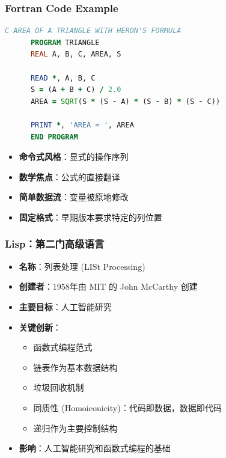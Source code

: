 \documentclass{beamer}
\begin{document}
\begin{frame}[fragile,t]
\frametitle{Fortran Code Example}
\scriptsize
\begin{lstlisting}[language=Fortran, caption=Fortran 77 Style]
C AREA OF A TRIANGLE WITH HERON'S FORMULA
      PROGRAM TRIANGLE
      REAL A, B, C, AREA, S
      
      READ *, A, B, C
      S = (A + B + C) / 2.0
      AREA = SQRT(S * (S - A) * (S - B) * (S - C))
      
      PRINT *, 'AREA = ', AREA
      END PROGRAM
\end{lstlisting}

\begin{itemize}
    \item \textbf{命令式风格}：显式的操作序列
    \item \textbf{数学焦点}：公式的直接翻译
    \item \textbf{简单数据流}：变量被原地修改
    \item \textbf{固定格式}：早期版本要求特定的列位置
\end{itemize}
\end{frame}

\begin{frame}[t]
\frametitle{Lisp：第二门高级语言}
\begin{itemize}
    \item \textbf{名称}：列表处理 (LISt Processing)
    \item \textbf{创建者}：1958年由 MIT 的 John McCarthy 创建
    \item \textbf{主要目标}：人工智能研究
    \item \textbf{关键创新}：
    \begin{itemize}
        \item 函数式编程范式
        \item 链表作为基本数据结构
        \item 垃圾回收机制
        \item 同质性 (Homoiconicity)：代码即数据，数据即代码
        \item 递归作为主要控制结构
    \end{itemize}
    \item \textbf{影响}：人工智能研究和函数式编程的基础
\end{itemize}
\end{frame}
\end{document}

